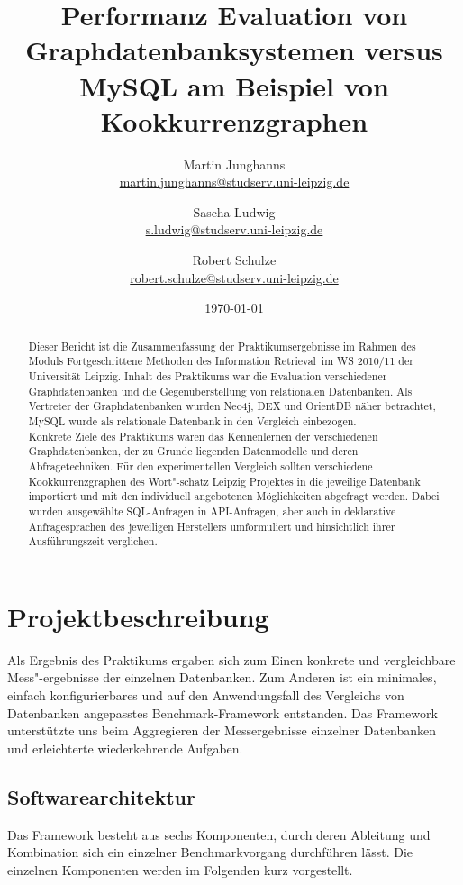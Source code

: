 \documentclass[11pt, a4paper, oneside]{article} %
\author{Martin Junghanns \\  \url{martin.junghanns@studserv.uni-leipzig.de} \and 
		Sascha Ludwig \\ \url{s.ludwig@studserv.uni-leipzig.de} \and 
		Robert Schulze \\ \url{robert.schulze@studserv.uni-leipzig.de} }
\date{\today}
\title{ Performanz Evaluation von Graphdatenbanksystemen versus MySQL am Beispiel von Kookkurrenzgraphen }
\begin{document}
\renewcommand{\labelitemi}{-}

\maketitle

\begin{abstract}
	Dieser Bericht ist die Zusammenfassung der Praktikumsergebnisse im Rahmen des Moduls \dq Fortgeschrittene Methoden des Information Retrieval\dq~im WS 2010/11 der Universität Leipzig. Inhalt des Praktikums war die Evaluation verschiedener Graphdatenbanken und die Gegenüberstellung von relationalen Datenbanken. Als Vertreter der Graphdatenbanken wurden Neo4j, DEX und OrientDB näher betrachtet, MySQL wurde als relationale Datenbank in den Vergleich einbezogen.\\
Konkrete Ziele des Praktikums waren das Kennenlernen der verschiedenen Graphdatenbanken, der zu Grunde liegenden Datenmodelle und deren Abfragetechniken. Für den experimentellen Vergleich sollten verschiedene Kookkurrenzgraphen des Wort"-schatz Leipzig Projektes in die jeweilige Datenbank importiert und mit den individuell angebotenen Möglichkeiten abgefragt werden. Dabei wurden ausgewählte SQL-Anfragen in API-Anfragen, aber auch in deklarative Anfragesprachen des jeweiligen Herstellers umformuliert und hinsichtlich ihrer Ausführungszeit verglichen.\\
\end{abstract}

\newpage
\tableofcontents 

\newpage

\section{Projektbeschreibung}
Als Ergebnis des Praktikums ergaben sich zum Einen konkrete und vergleichbare Mess"-ergebnisse der einzelnen Datenbanken. Zum Anderen ist ein minimales, einfach konfigurierbares und auf den Anwendungsfall des Vergleichs von Datenbanken angepasstes Benchmark-Framework entstanden. Das Framework unterstützte uns beim Aggregieren der Messergebnisse einzelner Datenbanken und erleichterte wiederkehrende Aufgaben. 
	
\subsection{Softwarearchitektur}
Das Framework besteht aus sechs Komponenten, durch deren Ableitung und Kombination sich ein einzelner Benchmarkvorgang durchführen lässt. Die einzelnen Komponenten werden im Folgenden kurz vorgestellt. 
\end{document}
